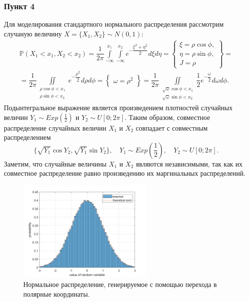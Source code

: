 \documentclass[oneside, final, 12pt]{article}
\def\P{{\mathbb{P} }}
\begin{document}
\subsubsection{Пункт 4}
	Для моделирования стандартного нормального распределения рассмотрим случаную величину
	$X=\{X_1, X_2\}\sim N(0,1):$
	$$
		\begin{gathered}
			\P(X_1<x_1, X_2<x_2) = \dfrac{1}{2\pi} \int\limits_{-\infty}^{x_1} \int\limits_{-\infty}^{x_2} 
														e^{-\dfrac{\xi^2+\eta^2}{2}}d\xi d\eta
			= \begin{Bmatrix}
					\xi = \rho \cos \phi, \\
					\eta = \rho \sin \phi, \\
					J = \rho
				\end{Bmatrix} = \\
			=	\dfrac{1}{2\pi} \iint\limits_{\begin{matrix} \rho \cos \phi < x_1 \\ \rho \sin \phi < x_2  \end{matrix}}	
						e^{-\dfrac{\rho^2}{2}}d\rho d\phi =  \begin{Bmatrix} \omega= \rho^2 \end{Bmatrix} 
			= \dfrac{1}{2\pi} \iint\limits_{\begin{matrix} \sqrt{\omega} \cos \phi < x_1 \\
																				 \sqrt{\omega} \sin \phi < x_2  
														  \end{matrix}}	
						\dfrac{1}{2}e^{-\dfrac{\omega}{2}}d\omega d\phi.
		\end{gathered}
	$$
	Подынтегральное выражение является произведением плотностей случайных величин 
	$Y_1\sim Exp(\frac{1}{2})$ и $Y_2\sim U[0;2\pi]$. Таким образом, совместное распределение
	случайных величин $X_1$ и $X_2$ совпадает с совместным распределением 
	$$
		\{\sqrt{Y_1}\cos Y_2, \sqrt{Y_1}\sin{Y_2}\}, \quad Y_1\sim Exp(\frac{1}{2}), \quad Y_2\sim U[0;2\pi].
	$$
	Заметим, что случайные величины $X_1$ и $X_2$ являются независимыми, так как их совместное
	распределение равно произведению их маргинальных распределений.
	
	\begin{figure}[h!]
		\centering
		\includegraphics[width=0.6\textwidth]{../code/Task_3/pict/norm_vis_ksi_ex.png}
		\caption{Нормальное распределение, генерируемое с помощью перехода в полярные координаты.}
    \end{figure}
		
\end{document}
